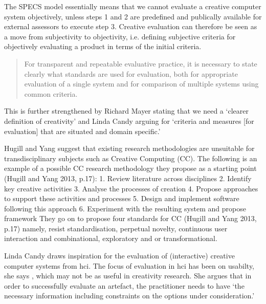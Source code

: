 The SPECS model essentially means that we cannot evaluate a creative computer system objectively, unless steps 1 and 2 are predefined and publically available for external assessors to execute step 3. Creative evaluation can therefore be seen as a move from subjectivity to objectivity, i.e. defining subjective criteria for objectively evaluating a product in terms of the initial criteria.

\begin{quotation}
  For transparent and repeatable evaluative practice, it is necessary to state clearly what standards are used for evaluation, both for appropriate evaluation of a single system and for comparison of multiple systems using common criteria. \cite{Jordanous2012a}
\end{quotation}

This is further strengthened by Richard Mayer stating that we need a `clearer definition of creativity' \cite{Mayer1999} and Linda Candy arguing for `criteria and measures [for evaluation] that are situated and domain specific.' \cite{Candy2012}



\begin{draft}
  Hugill and Yang suggest that existing research methodologies are unsuitable for transdisciplinary subjects such as Creative Computing (CC). The following is an example of a possible CC research methodology they propose as a starting point (Hugill and Yang 2013, p.17):
  1. Review literature across disciplines
  2. Identify key creative activities
  3. Analyse the processes of creation
  4. Propose approaches to support these activities and processes 5. Design and implement software following this approach
  6. Experiment with the resulting system and propose framework
  They go on to propose four standards for CC (Hugill and Yang 2013, p.17) namely, resist standardisation, perpetual novelty, continuous user interaction and combinational, exploratory and or transformational.
\end{draft}


\spirals

Linda Candy draws inspiration for the evaluation of (interactive) creative computer systems from \gls{hci}. The focus of evaluation in \gls{hci} has been on usabilty, she says \autocite[p.23]{Candy2012}, which may not be as useful in creativity research. She argues that in order to successfully evaluate an artefact, the practitioner needs to have `the necessary information including constraints on the options under consideration.' \autocite[p.7]{Candy2012}

